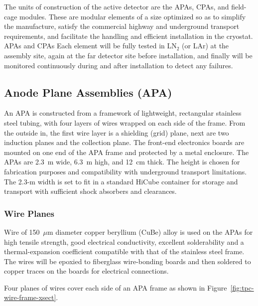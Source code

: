 The units of construction of the active detector are the APAs, CPAs,
and field-cage modules. These are modular elements of a size optimized
so as to simplify the manufacture, satisfy the commercial highway and
underground transport requirements, and facilitate the handling and 
efficient installation in the cryostat.  
APAs and CPAs 
Each element will be fully
tested in LN$_2$ (or LAr) at the assembly site, again at the far
detector site before installation, and finally will be monitored
continuously during and after installation to detect any failures.

\subsection{Anode Plane Assemblies (APA)}
\label{subsec:fd-ref-apa}

An APA is constructed from a framework of
lightweight, rectangular stainless steel tubing, with four layers of
wires wrapped on each side of the frame.
From the outside in, the first wire layer is a shielding (grid) plane, next are
two induction planes and the collection plane. 
%
The front-end electronics
boards are mounted on one end of the APA
frame and protected by a
metal enclosure.
The APAs are 2.3~m wide, 6.3~m high, and 12~cm thick. The height is
chosen for fabrication purposes and compatibility with underground
transport limitations. The 2.3-m width is set to fit in a standard
HiCube container 
for storage and transport with sufficient shock
absorbers and clearances.  


\subsubsection{Wire Planes}
\label{subsec:fd-ref-wireplanes}

Wire of 150~$\mu$m diameter copper beryllium (CuBe) alloy is used on the
APAs for high tensile strength, good electrical conductivity,
excellent solderability and a thermal-expansion coefficient
compatible with that of the stainless steel frame.  The wires will be
epoxied to fiberglass wire-bonding boards and then soldered to copper
traces on the boards for electrical connections.

Four planes of wires cover each side of an APA frame as shown in Figure~\ref{fig:tpc-wire-frame-xsect}.

